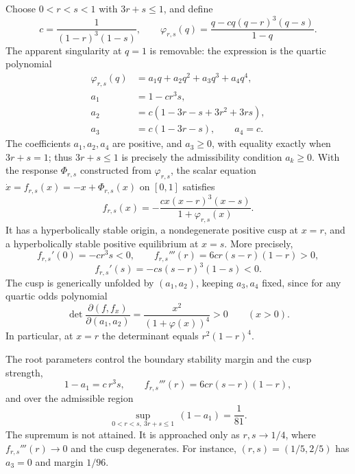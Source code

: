 Choose $0<r<s<1$ with $3r+s\le1$, and define
\[
 c=\frac{1}{(1-r)^3(1-s)},\qquad
 \varphi_{r,s}(q)=\frac{q-cq(q-r)^3(q-s)}{1-q}.
\]
The apparent singularity at $q=1$ is removable: the expression is the
quartic polynomial
\[
 \begin{aligned}
 \varphi_{r,s}(q)&=a_1q+a_2q^2+a_3q^3+a_4q^4,\\
 a_1&=1-cr^3s,\\
 a_2&=c(1-3r-s+3r^2+3rs),\\
 a_3&=c(1-3r-s),\qquad a_4=c.
 \end{aligned}
\]
The coefficients $a_1,a_2,a_4$ are positive, and $a_3\ge0$, with equality
exactly when $3r+s=1$; thus $3r+s\le1$ is precisely the admissibility
condition $a_k\ge0$. With the response $\Phi_{r,s}$
constructed from $\varphi_{r,s}$, the scalar equation
$\dot x=f_{r,s}(x)=-x+\Phi_{r,s}(x)$ on $[0,1]$ satisfies
\[
 f_{r,s}(x)=-\frac{cx(x-r)^3(x-s)}{1+\varphi_{r,s}(x)}.
\]
It has a hyperbolically stable origin, a nondegenerate positive cusp
at $x=r$, and a hyperbolically stable positive equilibrium at $x=s$.
More precisely,
\[
 f_{r,s}'(0)=-cr^3s<0,\qquad
 f_{r,s}'''(r)=6cr(s-r)(1-r)>0,
\]
\[
 f_{r,s}'(s)=-cs(s-r)^3(1-s)<0.
\]
The cusp is generically unfolded by $(a_1,a_2)$, keeping $a_3,a_4$
fixed, since for any quartic odds polynomial
\begin{equation}\label{eq:oddsUnfold}
 \det\frac{\partial(f,f_x)}{\partial(a_1,a_2)}
 =\frac{x^2}{(1+\varphi(x))^4}>0\qquad(x>0).
\end{equation}
In particular, at $x=r$ the determinant equals $r^2(1-r)^4$.

The root parameters control the boundary stability margin and the cusp
strength,
\begin{equation}\label{eq:rsMargin}
 1-a_1=c\,r^3s,\qquad f_{r,s}'''(r)=6cr(s-r)(1-r),
\end{equation}
and over the admissible region
\begin{equation}\label{eq:rsSup}
 \sup_{0<r<s,\ 3r+s\le1}\,(1-a_1)=\frac1{81}.
\end{equation}
The supremum is not attained. It is approached only as $r,s\to1/4$,
where $f_{r,s}'''(r)\to0$ and the cusp degenerates. For instance, $(r,s)=(1/5,2/5)$ has $a_3=0$ and margin $1/96$.

